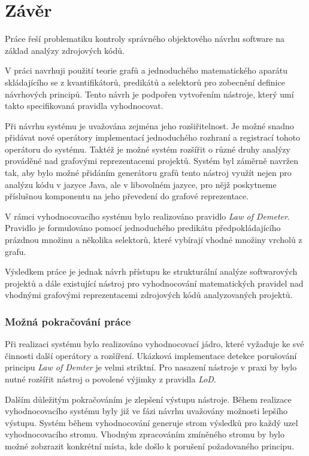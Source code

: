 \chapter{Závěr}

Práce řeší problematiku kontroly správného objektového návrhu software na základ analýzy zdrojových kódů. 

V práci navrhuji použití teorie grafů a jednoduchého matematického aparátu skládajícího se z kvantifikátorů, predikátů a selektorů pro zobecnění definice návrhových principů. Tento návrh je podpořen vytvořením nástroje, který umí takto specifikovaná pravidla vyhodnocovat.

Při návrhu systému je uvažována zejména jeho rozšiřitelnost. Je možné snadno přidávat nové operátory implementací jednoduchého rozhraní a registrací tohoto operátoru do systému. Taktéž je možné systém rozšířit o různé druhy analýzy prováděné nad grafovými reprezentacemi projektů. Systém byl záměrně navržen tak, aby bylo možné přidáním generátoru grafů tento nástroj využít nejen pro analýzu kódu v jazyce Java, ale v libovolném jazyce, pro nějž poskytneme příslušnou komponentu na jeho převedení do grafové reprezentace.

V rámci vyhodnocovacího systému bylo realizováno pravidlo \emph{Law of Demeter}. Pravidlo je formulováno pomocí jednoduchého predikátu předpokládajícího prázdnou množinu a několika selektorů, které vybírají vhodné množiny vrcholů z grafu.

Výsledkem práce je jednak návrh přístupu ke strukturální analýze softwarových projektů a dále existující nástroj pro vyhodnocování matematických pravidel nad vhodnými grafovými reprezentacemi zdrojových kódů analyzovaných projektů.

\subsection*{Možná pokračování práce}
Při realizaci systému bylo realizováno vyhodnocovací jádro, které vyžaduje ke své činnosti další operátory a rozšíření. Ukázková implementace detekce porušování principu \emph{Law of Demter} je velmi striktní. Pro nasazení nástroje v praxi by bylo nutné rozšířit nástroj o povolené výjimky z pravidla \emph{LoD}.

Dalším důležitým pokračováním je zlepšení výstupu nástroje. Během realizace vyhodnocovacího systému byly již ve fázi návrhu uvažovány možnosti lepšího výstupu. Systém během vyhodnocování generuje strom výsledků pro každý uzel vyhodnocovacího stromu. Vhodným zpracováním zmíněného stromu by bylo možné zobzrazit konkrétní místa, kde došlo k porušení požadovaného principu.
